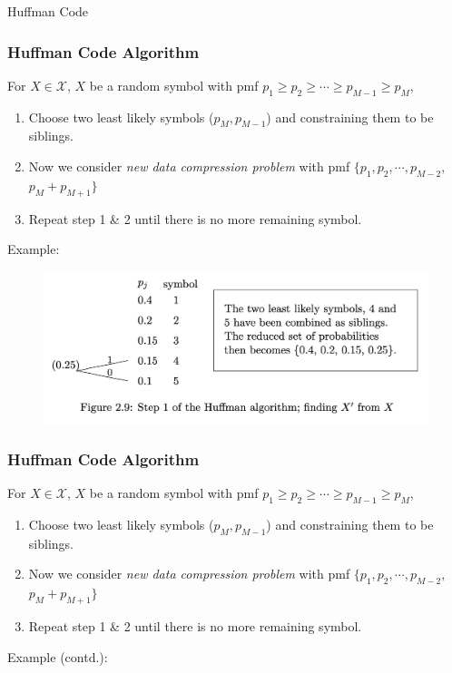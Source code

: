 \documentclass[9pt]{beamer}
\begin{document}
    \begin{section}{Huffman Code}
        \begin{frame}
            \frametitle{Huffman Code Algorithm}
            For $X \in \mathcal X$, $X$ be a random symbol with pmf $p_1 \ge p_2 \ge \cdots \ge p_{M-1} \ge p_M$,
            \begin{enumerate}
                \item Choose two least likely symbols ($p_M, p_{M-1}$) and constraining them to be siblings.
                \item Now we consider \textit{new data compression problem} with pmf $\{p_1, p_2, \cdots ,p_{M-2},$ \alert{$p_M + p_{M+1}\}$}
                \item Repeat step 1 \& 2 until there is no more remaining symbol.
            \end{enumerate}
            \vspace{0.5cm}
            Example:

            \begin{figure}
                \includegraphics[width=0.8\columnwidth]{image/L3_step1.png}
            \end{figure}
        \end{frame}

        \begin{frame}
            \frametitle{Huffman Code Algorithm}
            For $X \in \mathcal X$, $X$ be a random symbol with pmf $p_1 \ge p_2 \ge \cdots \ge p_{M-1} \ge p_M$,
            \begin{enumerate}
                \item Choose two least likely symbols ($p_M, p_{M-1}$) and constraining them to be siblings.
                \item Now we consider \textit{new data compression problem} with pmf $\{p_1, p_2, \cdots ,p_{M-2},$ \alert{$p_M + p_{M+1}\}$}
                \item Repeat step 1 \& 2 until there is no more remaining symbol.
            \end{enumerate}
            \vspace{0.5cm}
            Example (contd.):


\end{frame}
\end{section}
\end{document}
